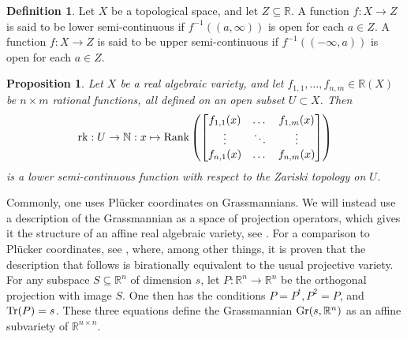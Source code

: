\documentclass{article}
\newtheorem{proposition}[theorem]{Proposition}
\theoremstyle{definition}
\newtheorem{definition}[theorem]{Definition}
\theoremstyle{remark}
\begin{document}
\begin{definition}
   Let $X$ be a topological space, and let $Z\subseteq \mathbb{R}$. A function $f: X\rightarrow Z$ is said to be lower semi-continuous if $f^{-1}((a, \infty))$ is open for each $a\in Z$. A function $f: X\rightarrow Z$ is said to be upper semi-continuous if $f^{-1}((-\infty, a))$ is open for each $a\in Z$. 
\end{definition}

\begin{proposition}\label{prop: Rank-lower semicont}
    Let $X$ be a real algebraic variety, and let $f_{1,1} ,\dots, f_{n,m}\in \mathbb{R}(X)$ be  $n\times m$ rational functions, all defined on an open subset $U\subset X$. Then 
    \begin{equation*}
        \textup{rk}: U\rightarrow \mathbb{N}:x \mapsto 
         \textup{Rank}\left(
        \begin{bmatrix}
            f_{1,1}(x) &\dots &f_{1,m}(x)\\
            \vdots &\ddots &\vdots\\
            f_{n,1}(x) &\dots &f_{n,m}(x)
        \end{bmatrix}\right)
    \end{equation*}
    is a lower semi-continuous function with respect to the Zariski topology on $U$.
\end{proposition}


Commonly, one uses Plücker coordinates on Grassmannians. We will instead use a description of the Grassmannian as a space of projection operators, which gives it the structure of an affine real algebraic variety, see \cite[Section 3.4.2]{Bochnak1998}. For a comparison to Plücker coordinates, see \cite{devriendt2025two}, where, among other things, it is proven that the description that follows is birationally equivalent to the usual projective variety. For any subspace $S\subseteq \mathbb{R}^{n}$ of dimension $s$, let $P: \mathbb{R}^{n}\rightarrow \mathbb{R}^{n}$ be the orthogonal projection with image $S$. One then has the conditions
$ P=P^{t}, P^2=P$, and $\textup{Tr}(P) = s$.
These three equations define the Grassmannian $\textup{Gr}(s, \mathbb{R}^{n})$ as an affine subvariety of $\mathbb{R}^{n\times n}$.
\end{document}
